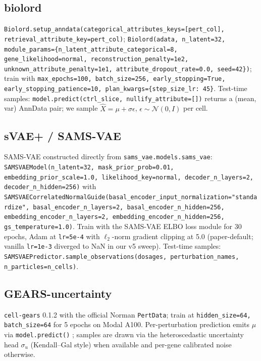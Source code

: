 \documentclass{article}
\begin{document}
\subsection{biolord \citep{piran2024biolord}}
\texttt{Biolord.setup\_anndata(categorical\_attributes\_keys=[pert\_col], retrieval\_attribute\_key=pert\_col)}; \texttt{Biolord(adata, n\_latent=32, module\_params=\{n\_latent\_attribute\_categorical=8, gene\_likelihood=normal, reconstruction\_penalty=1e2, unknown\_attribute\_penalty=1e1, attribute\_dropout\_rate=0.0, seed=42\})}; train with \texttt{max\_epochs=100, batch\_size=256, early\_stopping=True, early\_stopping\_patience=10, plan\_kwargs=\{step\_size\_lr: 45\}}. Test-time samples: \texttt{model.predict(ctrl\_slice, nullify\_attribute=[])} returns a (mean, var) AnnData pair; we sample $\hat{X} = \mu + \sigma \epsilon$, $\epsilon \sim \mathcal{N}(0, I)$ per cell.

\subsection{sVAE+ / SAMS-VAE \citep{bereket2023}}
SAMS-VAE constructed directly from \texttt{sams\_vae.models.sams\_vae}: \texttt{SAMSVAEModel(n\_latent=32, mask\_prior\_prob=0.01, embedding\_prior\_scale=1.0, likelihood\_key=normal, decoder\_n\_layers=2, decoder\_n\_hidden=256)} with \texttt{SAMSVAECorrelatedNormalGuide(basal\_encoder\_input\_normalization="standardize", basal\_encoder\_n\_layers=2, basal\_encoder\_n\_hidden=256, embedding\_encoder\_n\_layers=2, embedding\_encoder\_n\_hidden=256, gs\_temperature=1.0)}. Train with the SAMS-VAE ELBO loss module for 30 epochs, Adam at \texttt{lr=5e-4} with $\ell_2$-norm gradient clipping at 5.0 (paper-default; vanilla \texttt{lr=1e-3} diverged to NaN in our v5 sweep). Test-time samples: \texttt{SAMSVAEPredictor.sample\_observations(dosages, perturbation\_names, n\_particles=n\_cells)}.

\subsection{GEARS-uncertainty \citep{roohani2024gears}}
\texttt{cell-gears} 0.1.2 with the official Norman \texttt{PertData}; train at \texttt{hidden\_size=64, batch\_size=64} for 5 epochs on Modal A100. Per-perturbation prediction emits $\mu$ via \texttt{model.predict()} ; samples are drawn via the heteroscedastic uncertainty head $\sigma_u$ (Kendall--Gal style) when available and per-gene calibrated noise otherwise.
\end{document}

